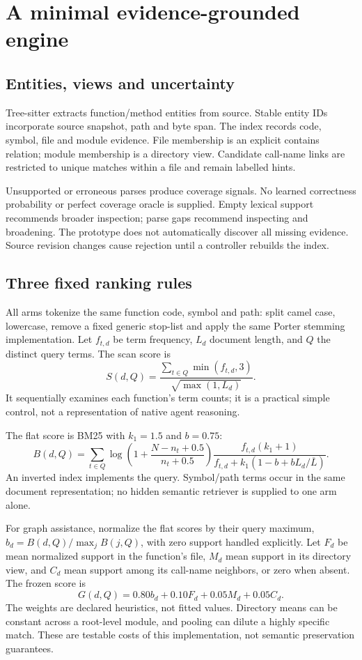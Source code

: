 \documentclass[11pt]{article}
\begin{document}
\section{A minimal evidence-grounded engine}
\subsection{Entities, views and uncertainty}
Tree-sitter extracts function/method entities from source. Stable entity IDs incorporate source snapshot, path and byte span. The index records code, symbol, file and module evidence. File membership is an explicit contains relation; module membership is a directory view. Candidate call-name links are restricted to unique matches within a file and remain labelled hints.

Unsupported or erroneous parses produce coverage signals. No learned correctness probability or perfect coverage oracle is supplied. Empty lexical support recommends broader inspection; parse gaps recommend inspecting and broadening. The prototype does not automatically discover all missing evidence. Source revision changes cause rejection until a controller rebuilds the index.

\subsection{Three fixed ranking rules}
All arms tokenize the same function code, symbol and path: split camel case, lowercase, remove a fixed generic stop-list and apply the same Porter stemming implementation. Let $f_{t,d}$ be term frequency, $L_d$ document length, and $Q$ the distinct query terms. The scan score is
\begin{equation}
S(d,Q)=\frac{\sum_{t\in Q}\min(f_{t,d},3)}{\sqrt{\max(1,L_d)}}.
\end{equation}
It sequentially examines each function's term counts; it is a practical simple control, not a representation of native agent reasoning.

The flat score is BM25 with $k_1=1.5$ and $b=0.75$:
\begin{equation}
B(d,Q)=\sum_{t\in Q}\log\!\left(1+\frac{N-n_t+0.5}{n_t+0.5}\right)
\frac{f_{t,d}(k_1+1)}{f_{t,d}+k_1(1-b+bL_d/\overline{L})}.
\end{equation}
An inverted index implements the query. Symbol/path terms occur in the same document representation; no hidden semantic retriever is supplied to one arm alone.

For graph assistance, normalize the flat scores by their query maximum, $b_d=B(d,Q)/\max_j B(j,Q)$, with zero support handled explicitly. Let $F_d$ be mean normalized support in the function's file, $M_d$ mean support in its directory view, and $C_d$ mean support among its call-name neighbors, or zero when absent. The frozen score is
\begin{equation}
G(d,Q)=0.80b_d+0.10F_d+0.05M_d+0.05C_d.
\end{equation}
The weights are declared heuristics, not fitted values. Directory means can be constant across a root-level module, and pooling can dilute a highly specific match. These are testable costs of this implementation, not semantic preservation guarantees.
\end{document}
